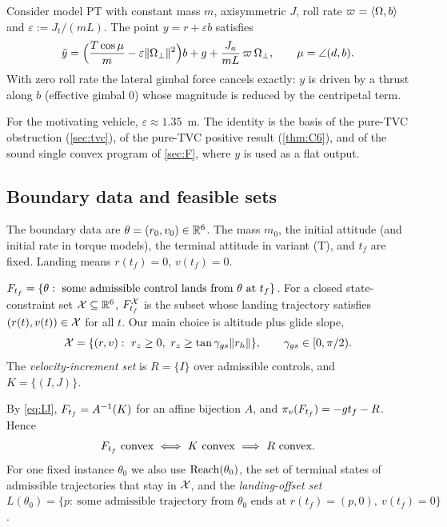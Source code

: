 \begin{lemma}\label{lem:cop}
Consider model PT with constant mass $m$, axisymmetric $J$, roll rate $\varpi=\langle \Omega,b\rangle$ and
$\varepsilon:=J_t/(mL)$. The point $y=r+\varepsilon b$ satisfies
\[
\ddot y=\Big(\frac{T\cos\mu}{m}-\varepsilon\lVert \Omega_\perp\rVert^2\Big)b+g+\frac{J_a}{mL}\,\varpi\,\Omega_\perp,
\qquad \mu=\angle(d,b).
\]
With zero roll rate the lateral gimbal force cancels exactly: $y$ is driven by a thrust along $b$ (effective gimbal
$0$) whose magnitude is reduced by the centripetal term.\Sproved\ 
\end{lemma}
For the motivating vehicle, $\varepsilon\approx1.35$~m. The identity is the basis of the pure-TVC obstruction
(\cref{sec:tvc}), of the pure-TVC positive result (\cref{thm:C6}), and of the sound single convex program of \cref{sec:F}, where
$y$ is used as a flat output.

\subsection{Boundary data and feasible sets}
The boundary data are $\theta=(r_0,v_0)\in\mathbb{R}^6$. The mass $m_0$, the initial attitude (and initial rate in torque models),
the terminal attitude in variant (T), and $t_f$ are fixed. Landing means $r(t_f)=0$, $v(t_f)=0$.
\begin{definition}
$F_{t_f}=\{\theta:\ \text{some admissible control lands from }\theta\text{ at }t_f\}$. For a closed state-constraint set
$\mathcal X\subseteq\mathbb{R}^6$, $F^{\mathcal X}_{t_f}$ is the subset whose landing trajectory satisfies $(r(t),v(t))\in\mathcal X$ for all $t$. Our main
choice is altitude plus glide slope,
\begin{equation}\label{eq:X}
\mathcal X=\{(r,v):\ r_z\ge0,\ r_z\ge\tan\gamma_{gs}\lVert r_h\rVert\},\qquad \gamma_{gs}\in[0,\pi/2).
\end{equation}
The \emph{velocity-increment set} is $R=\{I\}$ over admissible controls, and $K=\{(I,J)\}$.
\end{definition}
By \eqref{eq:IJ}, $F_{t_f}=A^{-1}(K)$ for an affine bijection $A$, and $\pi_v(F_{t_f})=-gt_f-R$. Hence
\[
\Ft\ \text{convex}\ \Longleftrightarrow\ K\ \text{convex}\ \Longrightarrow\ R\ \text{convex}.
\]
For one fixed instance $\theta_0$ we also use $\mathrm{Reach}(\theta_0)$, the set of terminal states of admissible
trajectories that stay in $\mathcal X$, and the \emph{landing-offset set}
$L(\theta_0)=\{p:\ \text{some admissible trajectory from }\theta_0\text{ ends at }r(t_f)=(p,0),\ v(t_f)=0\}$.

